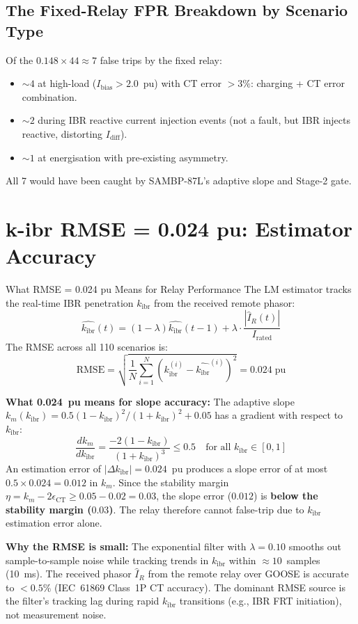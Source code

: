 \documentclass[12pt,a4paper]{article}
\newcommand{\kibr}{k_\mathrm{ibr}}
\begin{document}
\subsection{The Fixed-Relay FPR Breakdown by Scenario Type}

Of the $0.148 \times 44 \approx 7$ false trips by the fixed relay:
\begin{itemize}[nosep]
  \item $\sim 4$ at high-load ($I_\mathrm{bias} > 2.0$~pu) with CT error $> 3\%$: charging + CT error combination.
  \item $\sim 2$ during IBR reactive current injection events (not a fault, but IBR injects reactive, distorting $I_\mathrm{diff}$).
  \item $\sim 1$ at energisation with pre-existing asymmetry.
\end{itemize}
All 7 would have been caught by SAMBP-87L's adaptive slope and Stage-2 gate.

\section{k-ibr RMSE = 0.024 pu: Estimator Accuracy}

\begin{formulabox}{What RMSE = 0.024 pu Means for Relay Performance}
The LM estimator tracks the real-time IBR penetration $\kibr$ from the received remote phasor:
\[
  \hat{\kibr}(t) = (1-\lambda)\hat{\kibr}(t-1) + \lambda \cdot \frac{|\hat{I}_R(t)|}{I_\mathrm{rated}}
\]
The RMSE across all 110 scenarios is:
\[
  \mathrm{RMSE} = \sqrt{\frac{1}{N}\sum_{i=1}^{N}(\kibr^{(i)} - \hat{\kibr}^{(i)})^2} = 0.024\;\mathrm{pu}
\]

\textbf{What 0.024~pu means for slope accuracy:} The adaptive slope $k_m(\kibr) = 0.5(1-\kibr)^2/(1+\kibr)^2 + 0.05$ has a gradient with respect to $\kibr$:
\[
  \frac{dk_m}{d\kibr} = \frac{-2(1-\kibr)}{(1+\kibr)^3} \leq 0.5 \quad \text{for all } \kibr \in [0,1]
\]
An estimation error of $|\Delta\kibr| = 0.024$~pu produces a slope error of at most $0.5 \times 0.024 = 0.012$ in $k_m$. Since the stability margin $\eta = k_m - 2\epsilon_\mathrm{CT} \geq 0.05 - 0.02 = 0.03$, the slope error ($0.012$) is \textbf{below the stability margin ($0.03$)}. The relay therefore cannot false-trip due to $\kibr$ estimation error alone.

\textbf{Why the RMSE is small:} The exponential filter with $\lambda = 0.10$ smooths out sample-to-sample noise while tracking trends in $\kibr$ within $\approx 10$~samples (10~ms). The received phasor $\hat{I}_R$ from the remote relay over GOOSE is accurate to $< 0.5\%$ (IEC~61869 Class~1P CT accuracy). The dominant RMSE source is the filter's tracking lag during rapid $\kibr$ transitions (e.g., IBR FRT initiation), not measurement noise.
\end{formulabox}
\end{document}
